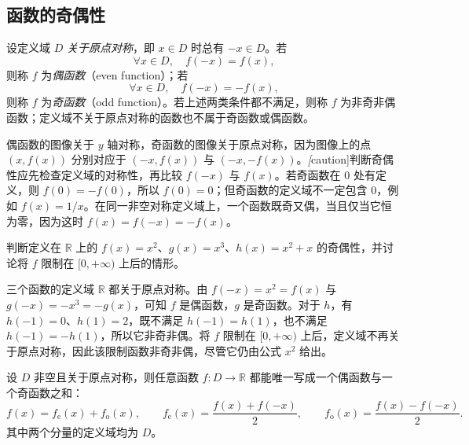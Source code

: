 \subsection{函数的奇偶性}
\label{subsec:parity-of-functions}

\begin{definition}
\label{def:even-and-odd-functions}
设定义域 $D$ \emph{关于原点对称}，即 $x\in D$ 时总有 $-x\in D$。若
\[
    \forall x\in D,\quad f(-x)=f(x),
\]
则称 $f$ 为\emph{偶函数}（even function）；若
\[
    \forall x\in D,\quad f(-x)=-f(x),
\]
则称 $f$ 为\emph{奇函数}（odd function）。若上述两类条件都不满足，则称 $f$ 为非奇非偶函数；定义域不关于原点对称的函数也不属于奇函数或偶函数。
\end{definition}

偶函数的图像关于 $y$ 轴对称，奇函数的图像关于原点对称，因为图像上的点 $(x,f(x))$ 分别对应于 $(-x,f(x))$ 与 $(-x,-f(x))$。\emph[caution]{判断奇偶性应先检查定义域的对称性，再比较 $f(-x)$ 与 $f(x)$。}若奇函数在 $0$ 处有定义，则 $f(0)=-f(0)$，所以 $f(0)=0$；但奇函数的定义域不一定包含 $0$，例如 $f(x)=1/x$。在同一非空对称定义域上，一个函数既奇又偶，当且仅当它恒为零，因为这时 $f(x)=f(-x)=-f(x)$。

\begin{example}
\label{ex:parity-and-domain}
判断定义在 $\mathbb{R}$ 上的 $f(x)=x^2$、$g(x)=x^3$、$h(x)=x^2+x$ 的奇偶性，并讨论将 $f$ 限制在 $[0,+\infty)$ 上后的情形。
\end{example}

\begin{solve}
三个函数的定义域 $\mathbb{R}$ 都关于原点对称。由 $f(-x)=x^2=f(x)$ 与 $g(-x)=-x^3=-g(x)$，可知 $f$ 是偶函数，$g$ 是奇函数。对于 $h$，有 $h(-1)=0$、$h(1)=2$，既不满足 $h(-1)=h(1)$，也不满足 $h(-1)=-h(1)$，所以它非奇非偶。将 $f$ 限制在 $[0,+\infty)$ 上后，定义域不再关于原点对称，因此该限制函数非奇非偶，尽管它仍由公式 $x^2$ 给出。
\end{solve}

\begin{proposition}[奇偶分解]
\label{prop:even-odd-decomposition}
设 $D$ 非空且关于原点对称，则任意函数 $f:D\to\mathbb{R}$ 都能唯一写成一个偶函数与一个奇函数之和：
\begin{equation}
    f(x)=f_{\mathrm e}(x)+f_{\mathrm o}(x),\qquad
    f_{\mathrm e}(x)=\frac{f(x)+f(-x)}{2},\qquad
    f_{\mathrm o}(x)=\frac{f(x)-f(-x)}{2}.
    \label{eq:even-odd-decomposition}
\end{equation}
其中两个分量的定义域均为 $D$。
\end{proposition}

